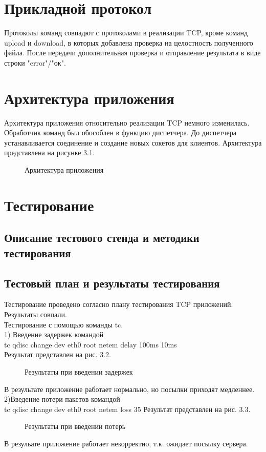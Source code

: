 \documentclass[12pt,a4paper]{report}
\begin{document}
\section{Прикладной протокол}
Протоколы команд совпадют с протоколами в реализации TCP, кроме команд upload и download, в которых добавлена проверка на целостность полученного файла. После передачи дополнительная проверка и отправление результата в виде строки "error"/"ок".

\section{Архитектура приложения}
Архитектура приложения относительно реализации TCP немного изменилась. Обработчик команд был обособлен в функцию диспетчера. До диспетчера устанавливается соединение и создание новых сокетов для клиентов.
Архитектура представлена на рисунке 3.1.
\begin{figure}[h!]
				\caption{Архитектура приложения}
				\label{img:arch2}
			\end{figure}

\section{Тестирование}
\subsection{Описание тестового стенда и методики тестирования}
\subsection{Тестовый план и результаты тестирования}
Тестирование проведено согласно плану тестирования TCP приложений. Результаты совпали.
\\
Тестирование с помощью команды tc.\\
1) Введение задержек командой\\
tc qdisc change dev eth0 root netem delay 100ms 10ms\\
Результат представлен на рис. 3.2.\\
\begin{figure}[h!]
				\caption{Результаты при введении задержек}
				\label{img:stest1}
			\end{figure}
В результате приложение работает нормально, но посылки приходят медленнее.
2)Введение потери пакетов командой \\
tc qdisc change dev eth0 root netem loss 35%
Результат представлен на рис. 3.3.\\
\begin{figure}[h!]
				\caption{Результаты при введении потерь}
				\label{img:stest3}
			\end{figure}
В резульате приложение работает некорректно, т.к. ожидает посылку сервера.\\
\end{document}
